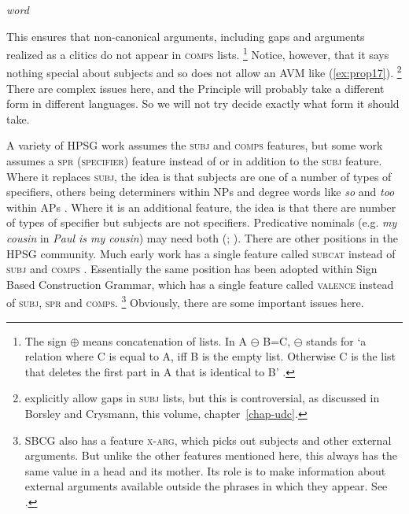 \documentclass[output=paper
	        ,collection
	        ,collectionchapter
 	        ,biblatex
                ,babelshorthands
                ,newtxmath
                ,draftmode
                ,colorlinks, citecolor=brown
]{langscibook}
\begin{document}
\ea\label{ex:prop20}
\emph{word} \impl
{}
\z

This ensures that non-canonical arguments, including gaps and arguments realized as a clitics do not appear in \textsc{comps} lists.%
%
\footnote{The sign $\oplus$ means concatenation of lists. In A $\ominus$ B=C, $\ominus$ stands for ‘a relation where C is equal to A, iff B is the empty list. Otherwise C is the list that deletes the first part in A that is identical to B’ \citep[]{Mueller2000h}.}
%
Notice, however, that it says nothing special about subjects and so does not allow an AVM like (\ref{ex:prop17}).%
%
\footnote{\citet[177--183]{GSag2000a-u} explicitly allow gaps in \textsc{subj} lists, but this is controversial, as discussed in Borsley and Crysmann, this volume, chapter~\ref{chap-udc}.}
%
There are complex issues here, and the Principle will probably take a different form in different languages. So we will not try decide exactly what form it should take.

A variety of HPSG work assumes the \textsc{subj} and \textsc{comps} features, but some work assumes a \textsc{spr (specifier)} feature instead of or in addition to the \textsc{subj} feature. Where it replaces \textsc{subj}, the idea is that subjects are one of a number of types of specifiers, others being determiners within NPs and degree words like \emph{so} and \emph{too} within APs \citep{SWB2003a}. Where it is an additional feature, the idea is that there are number of types of specifier but subjects are not specifiers. Predicative nominals (e.g. \emph{my cousin} in \emph{Paul is my cousin}) may need both (\citealp[9.4.1]{ps2}; \citealp[409]{GSag2000a-u}\citealp{AG2003b-u}). There are other positions in the HPSG community. Much early work has a single feature called \textsc{subcat} instead of \textsc{subj} and \textsc{comps} \citep{ps}. Essentially the same position has been adopted within Sign Based Construction Grammar, which has a single feature called \textsc{valence} instead of \textsc{subj, spr} and \textsc{comps}.%
%
\footnote{SBCG also has a feature \textsc{x-arg}, which picks out subjects and other external arguments. But unlike the other features mentioned here, this always has the same value in a head and its mother. Its role is to make information about external arguments available outside the phrases in which they appear.  See \citet[84, 149--151]{Sag2007a,Sag2012a}.}
%
Obviously, there are some important issues here.
\end{document}
